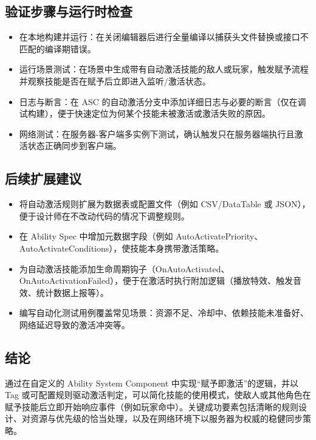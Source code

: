 \documentclass[10pt,CJKmath]{zhbook-v1}
\begin{document}
\subsection{验证步骤与运行时检查}
\begin{itemize}
\item 在本地构建并运行：在关闭编辑器后进行全量编译以捕获头文件替换或接口不匹配的编译期错误。
\item 运行场景测试：在场景中生成带有自动激活技能的敌人或玩家，触发赋予流程并观察技能是否在赋予后立即进入监听/激活状态。
\item 日志与断言：在 ASC 的自动激活分支中添加详细日志与必要的断言（仅在调试构建），便于快速定位为何某个技能未被激活或激活失败的原因。
\item 网络测试：在服务器-客户端多实例下测试，确认触发只在服务器端执行且激活状态正确同步到客户端。
\end{itemize}

\subsection{后续扩展建议}
\begin{itemize}
\item 将自动激活规则扩展为数据表或配置文件（例如 CSV/DataTable 或 JSON），便于设计师在不改动代码的情况下调整规则。
\item 在 Ability Spec 中增加元数据字段（例如 AutoActivatePriority、AutoActivateConditions），使技能本身携带激活策略。
\item 为自动激活技能添加生命周期钩子（OnAutoActivated、OnAutoActivationFailed），便于在激活时执行附加逻辑（播放特效、触发音效、统计数据上报等）。
\item 编写自动化测试用例覆盖常见场景：资源不足、冷却中、依赖技能未准备好、网络延迟导致的激活冲突等。
\end{itemize}

\subsection{结论}
通过在自定义的 Ability System Component 中实现“赋予即激活”的逻辑，并以 Tag 或可配置规则驱动激活判定，可以简化技能的使用模式，使敌人或其他角色在赋予技能后立即开始响应事件（例如玩家命中）。关键成功要素包括清晰的规则设计、对资源与优先级的恰当处理，以及在网络环境下以服务器为权威的稳健同步策略。
\end{document}
